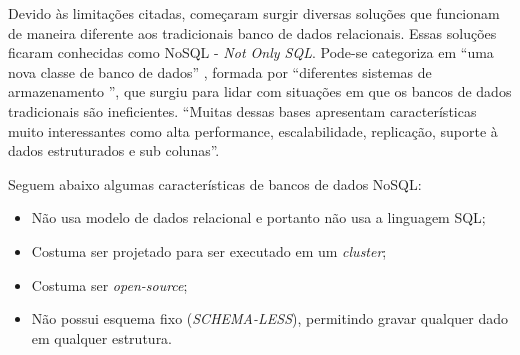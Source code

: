 Devido às limitações citadas, começaram surgir diversas soluções que funcionam de maneira diferente aos tradicionais banco de dados relacionais. Essas soluções ficaram conhecidas como NoSQL - \textit{Not Only SQL}. Pode-se categoriza em ``uma nova classe de banco de dados'' \cite{AnaliseNosql}, formada por ``diferentes sistemas de armazenamento ''\cite{NosqlIm}, que surgiu para lidar com situações em que os bancos de dados tradicionais são ineficientes. ``Muitas dessas bases apresentam características muito interessantes como alta performance, escalabilidade, replicação, suporte à dados estruturados e sub colunas''\cite{NosqlIm}. 

Seguem abaixo algumas características de bancos de dados NoSQL\cite{compBds}:
\begin{itemize}
\item Não usa modelo de dados relacional e portanto não usa a linguagem SQL;
\item Costuma ser projetado para ser executado em um \textit{cluster};
\item Costuma ser \textit{open-source};
\item Não possui esquema fixo (\textit{SCHEMA-LESS}), permitindo gravar qualquer dado em qualquer estrutura.
\end{itemize}

